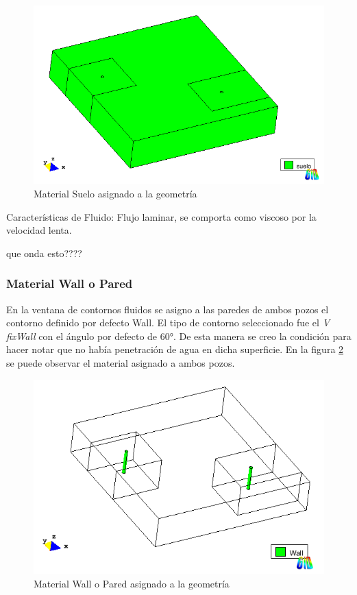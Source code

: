 \documentclass[10pt,a4paper,final]{article}
\begin{document}
\begin{figure}[tbhp]
\centerline{\includegraphics[scale=0.75]{img/datos_materiales_suelo_vista}}
\caption{Material Suelo asignado a la geometría}
\label{datos_materiales_suelo_vista}
\end{figure}

Características de Fluido: Flujo laminar, se comporta como viscoso por la velocidad lenta. \begin{LARGE}
que onda esto????
\end{LARGE} 
%
\subsubsection{Material Wall o Pared}
En la ventana de contornos fluidos se asigno a las paredes de ambos pozos el contorno definido por defecto Wall. El tipo de contorno seleccionado fue el \emph{V fixWall} con el ángulo por defecto de $60°$. De esta manera se creo la condición para hacer notar que no había penetración de agua en dicha superficie. En la figura \ref{datos_contornos_fluidos_vista} se puede observar el material asignado a ambos pozos.
\begin{figure}[tbhp]
\centerline{\includegraphics[scale=0.75]{img/datos_contornos_fluidos_vista}}
\caption{Material Wall o Pared asignado a la geometría}
\label{datos_contornos_fluidos_vista}
\end{figure}
\end{document}
